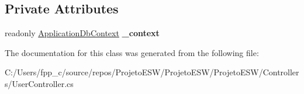 \subsection*{Private Attributes}
\begin{DoxyCompactItemize}
\item 
\mbox{\label{class_projeto_e_s_w_1_1_controllers_1_1_user_controller_ad1b007bbba8f8e0f646977d1caa5d73f}} 
readonly \mbox{\hyperlink{class_projeto_e_s_w_1_1_data_1_1_application_db_context}{Application\+Db\+Context}} {\bfseries \+\_\+context}
\end{DoxyCompactItemize}


The documentation for this class was generated from the following file\+:\begin{DoxyCompactItemize}
\item 
C\+:/\+Users/fpp\+\_\+c/source/repos/\+Projeto\+E\+S\+W/\+Projeto\+E\+S\+W/\+Projeto\+E\+S\+W/\+Controllers/User\+Controller.\+cs\end{DoxyCompactItemize}
